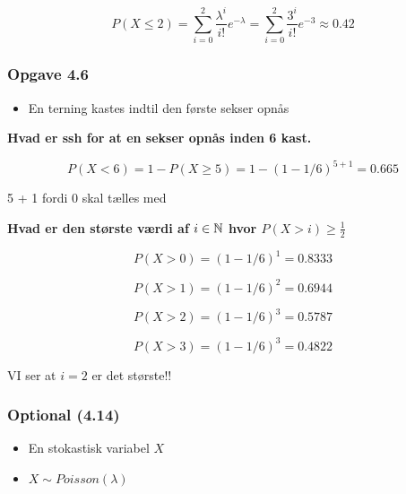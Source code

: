 \begin{equation}
    P(X \leq 2) = \sum_{i=0}^2 \frac{\lambda^i}{i!}e^{-\lambda} = \sum_{i=0}^2 \frac{3^i}{i!}e^{-3} \approx 0.42
\end{equation}

\subsubsection{Opgave 4.6}

\begin{itemize}
    \item En terning kastes indtil den første sekser opnås
\end{itemize}

\textbf{Hvad er ssh for at en sekser opnås inden 6 kast.}

\begin{equation}
    P(X<6) = 1 - P(X\geq 5) = 1 - (1-1/6)^{5+1} = 0.665 
\end{equation}

5 + 1 fordi 0 skal tælles med

\textbf{Hvad er den største værdi af $i \in \mathbb{N}$ hvor $P(X>i) \geq \frac{1}{2}$ }

\begin{equation}
    P(X > 0) = ( 1 - 1/6)^1 =  0.8333
\end{equation}

\begin{equation}
    P(X > 1) = ( 1 - 1/6)^2 = 0.6944
\end{equation}

\begin{equation}
    P(X > 2) = ( 1 - 1/6)^3 = 0.5787
\end{equation}

\begin{equation}
     P(X > 3) = ( 1 - 1/6)^3 = 0.4822
\end{equation}

VI ser at $i=2$ er det største!!

\subsubsection{Optional (4.14)}

\begin{itemize}
    \item En stokastisk variabel $X$
    \item $X \sim Poisson(\lambda) $
\end{itemize}

